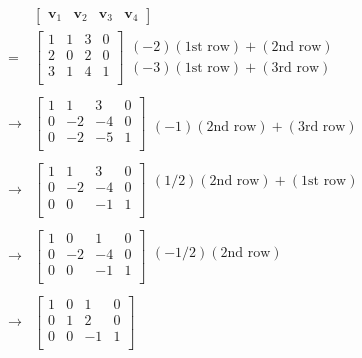 \documentclass[
  11pt,
  a4paper,
  oneside]{scrbook}
\theoremstyle{definition}
\theoremstyle{definition}
\theoremstyle{plain}
\theoremstyle{remark}
\begin{document}
\[
\begin{aligned}
& 
\begin{bmatrix}
 \pmb v_1 & \pmb v_2 & \pmb v_3 & \pmb v_4
\end{bmatrix}
\\
=
& 
\begin{bmatrix}
1 & 1 & 3 & 0\\
2 & 0 & 2 & 0\\
3 & 1 & 4 & 1\\
\end{bmatrix}
\begin{array}{c}
\\
(-2)(\text{1st row}) + (\text{2nd row}) \\
(-3)(\text{1st row}) + (\text{3rd row}) \\
\end{array} \\
& \\
\rightarrow
& 
\begin{bmatrix}
1 & 1 & 3 & 0\\
0 & -2 & -4 & 0\\
0 & -2 & -5 & 1 \\
\end{bmatrix}
\begin{array}{c}
\\
\\
(-1)(\text{2nd row}) + (\text{3rd row}) \\
\end{array} \\
& \\
\rightarrow
& 
\begin{bmatrix}
1 & 1 & 3 & 0\\
0 & -2 & -4 & 0\\
0 & 0 & -1 & 1 \\
\end{bmatrix}
\begin{array}{c}
(1/2)(\text{2nd row}) + (\text{1st row}) \\
\\
\\
\end{array} \\
& \\
\rightarrow
& 
\begin{bmatrix}
1 & 0 & 1 & 0\\
0 & -2 & -4 & 0\\
0 & 0 & -1 & 1 \\
\end{bmatrix}
\begin{array}{c}
\\
(-1/2)(\text{2nd row}) \\
\\
\end{array} \\
& \\
\rightarrow
& 
\begin{bmatrix}
1 & 0 & 1 & 0\\
0 & 1 & 2 & 0\\
0 & 0 & -1 & 1 \\
\end{bmatrix}
\end{aligned}
\]
\end{document}
